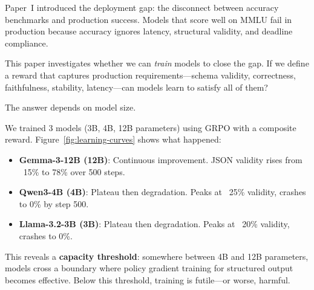 \documentclass[11pt]{article}
\begin{document}
Paper~I introduced the deployment gap: the disconnect between accuracy benchmarks and production success.
Models that score well on MMLU fail in production because accuracy ignores latency, structural validity, and deadline compliance.

This paper investigates whether we can \emph{train} models to close the gap.
If we define a reward that captures production requirements---schema validity, correctness, faithfulness, stability, latency---can models learn to satisfy all of them?

The answer depends on model size.

We trained 3 models (3B, 4B, 12B parameters) using GRPO with a composite reward.
Figure~\ref{fig:learning-curves} shows what happened:
\begin{itemize}[leftmargin=12pt]
    \item \textbf{Gemma-3-12B (12B)}: Continuous improvement. JSON validity rises from ~15\% to 78\% over 500 steps.
    \item \textbf{Qwen3-4B (4B)}: Plateau then degradation. Peaks at ~25\% validity, crashes to 0\% by step 500.
    \item \textbf{Llama-3.2-3B (3B)}: Plateau then degradation. Peaks at ~20\% validity, crashes to 0\%.
\end{itemize}

This reveals a \textbf{capacity threshold}: somewhere between 4B and 12B parameters, models cross a boundary where policy gradient training for structured output becomes effective.
Below this threshold, training is futile---or worse, harmful.
\end{document}
